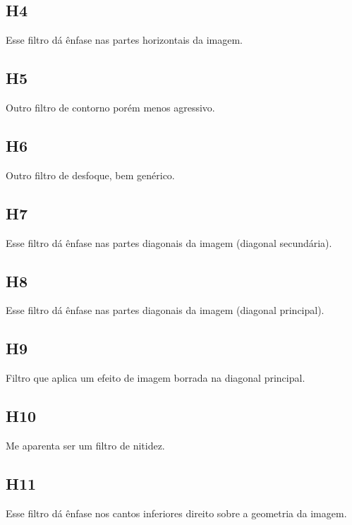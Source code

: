 \documentclass[12pt, letterpaper]{article}
\begin{document}
	\subsection{H4}
		Esse filtro dá ênfase nas partes horizontais da imagem.
	\subsection{H5}
		Outro filtro de contorno porém menos agressivo.
	\subsection{H6}
		Outro filtro de desfoque, bem genérico.
	\subsection{H7}
		Esse filtro dá ênfase nas partes diagonais da imagem (diagonal secundária).
	\subsection{H8}
		Esse filtro dá ênfase nas partes diagonais da imagem (diagonal principal).
	\subsection{H9}
		Filtro que aplica um efeito de imagem borrada na diagonal principal.
	\subsection{H10}
		Me aparenta ser um filtro de nitidez.
	\subsection{H11}
		Esse filtro dá ênfase nos cantos inferiores direito sobre a geometria da imagem.
\end{document}
